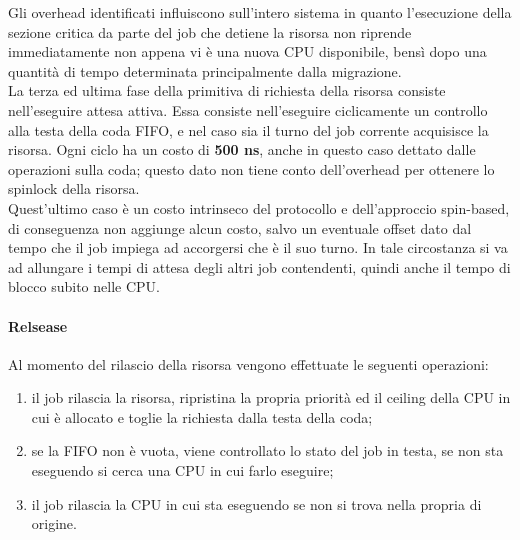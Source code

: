 Gli overhead identificati influiscono sull'intero sistema in quanto l'esecuzione della sezione critica da parte del job che detiene la risorsa non riprende immediatamente non appena vi è una nuova CPU disponibile, bensì dopo una quantità di tempo determinata principalmente dalla migrazione.\\

La terza ed ultima fase della primitiva di richiesta della risorsa consiste nell'eseguire attesa attiva. Essa consiste nell'eseguire ciclicamente un controllo alla testa della coda FIFO, e nel caso sia il turno del job corrente acquisisce la risorsa. Ogni ciclo ha un costo di \textbf{500 ns}, anche in questo caso dettato dalle operazioni sulla coda; questo dato non tiene conto dell'overhead per ottenere lo spinlock della risorsa.\\

Quest'ultimo caso è un costo intrinseco del protocollo e dell'approccio spin-based, di conseguenza non aggiunge alcun costo, salvo un eventuale offset dato dal tempo che il job impiega ad accorgersi che è il suo turno. In tale circostanza si va ad allungare i tempi di attesa degli altri job contendenti, quindi anche il tempo di blocco subito nelle CPU.\\

\paragraph{Relsease} Al momento del rilascio della risorsa vengono effettuate le seguenti operazioni:

\begin{enumerate}
	\item il job rilascia la risorsa, ripristina la propria priorità ed il ceiling della CPU in cui è allocato e toglie la richiesta dalla testa della coda;
	\item se la FIFO non è vuota, viene controllato lo stato del job in testa, se non sta eseguendo si cerca una CPU in cui farlo eseguire;
	\item il job rilascia la CPU in cui sta eseguendo se non si trova nella propria di origine.
\end{enumerate}

